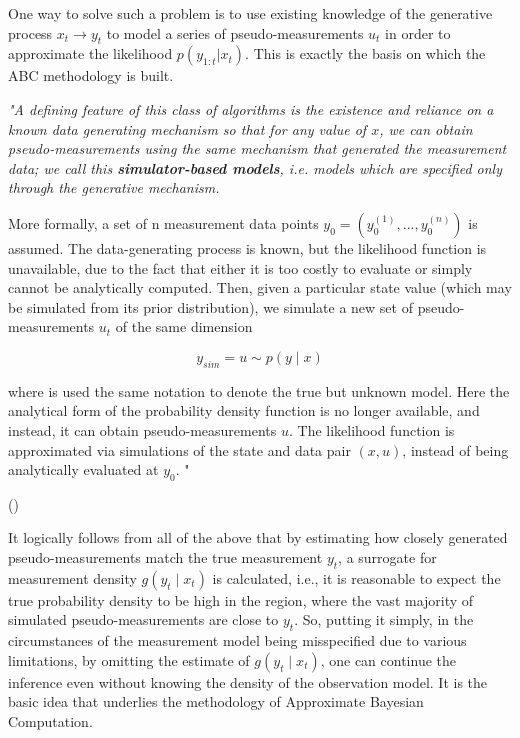 One way to solve such a problem is to use existing knowledge of the generative process \(x_t \rightarrow y_t\) to model a series of pseudo-measurements \(u_t\) in order to approximate the likelihood \(p\left(y_{1:t} | x_t\right)\). This is exactly the basis on which the ABC methodology is built. {\em "A defining feature of this class of algorithms is the existence and reliance on a known data generating mechanism so that for any value of \(x\), we can obtain pseudo-measurements using the same mechanism that generated the measurement data; we call this \textbf{simulator-based models}, i.e. models which are specified only through the generative mechanism. 

More formally, a set of n measurement data points \(y_0 = \left(y_0^{(1)},...,y_0^{(n)}\right)\) is assumed. The data-generating process is known, but the likelihood function is unavailable, due to the fact that either it is too costly to evaluate or simply cannot be analytically computed. Then, given a particular state value (which may be simulated from its prior distribution), we simulate a new set of pseudo-measurements \(u_t\) of
the same dimension

\begin{equation}
y_{sim} = u \sim p\left( y \mid x \right)
\end{equation}

\noindent where is used the same notation to denote the true but unknown model. Here the analytical form of the probability density function is no longer available, and instead, it can obtain pseudo-measurements \(u\). The likelihood function is approximated via simulations of the state and data pair \(\left(x, u\right)\), instead of being analytically evaluated at \(y_0\).
"} (\cite[page~2]{grazian_review_2019})

It logically follows from all of the above that by estimating how closely generated pseudo-measurements match the true measurement \(y_t\), a surrogate for measurement density \(g\left(y_t \mid x_t \right)\) is calculated, i.e., it is reasonable to expect the true probability density to be high in the region, where the vast majority of simulated pseudo-measurements are close to \(y_t\). So, putting it simply, in the circumstances of the measurement model being misspecified due to various limitations, by omitting the estimate of \(g\left(y_t \mid x_t \right)\), one can continue the inference even without knowing the density of the observation model. It is the basic idea that underlies the methodology of Approximate Bayesian Computation.

